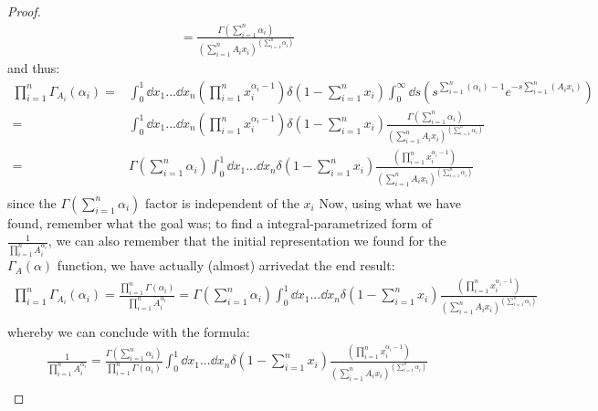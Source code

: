 \documentclass[a4paper,twoside]{article}
\begin{document}
\begin{proof}
\begin{align*}
= \frac{\Gamma \left( \sum_{i=1}^{n} \alpha_{i} \right)}{\left( \sum_{i=1}^{n}A_{i}x_{i} \right)^{\left( \sum_{i=1}^{n} \alpha_{i} \right)}} 
\end{align*}
and thus:
\begin{align*}
\prod_{i=1}^{n}\Gamma_{A_{i}}(\alpha_{i}) 
=&  \int_{0}^{1} \dd{x_{1}}...\dd{x_{n}} \left( \prod_{i=1}^{n} x_{i}^{\alpha_{i} - 1} \right) \delta \left(1 - \sum_{i=1}^{n}x_{i}\right) 
\int_{0}^{\infty} \dd{s} \left( s^{\sum_{i=1}^{n}(\alpha_{i}) - 1} e^{-s\sum_{i=1}^{n}(A_{i} x_{i})} \right) \\
=&  \int_{0}^{1} \dd{x_{1}}...\dd{x_{n}} \left( \prod_{i=1}^{n} x_{i}^{\alpha_{i} - 1} \right) \delta \left(1 - \sum_{i=1}^{n}x_{i}\right) 
\frac{\Gamma \left( \sum_{i=1}^{n} \alpha_{i} \right)}{\left( \sum_{i=1}^{n}A_{i}x_{i} \right)^{\left( \sum_{i=1}^{n} \alpha_{i} \right)}} \\
=& \Gamma \left( \sum_{i=1}^{n} \alpha_{i} \right)
 \int_{0}^{1} \dd{x_{1}}...\dd{x_{n}} 
\delta \left(1 - \sum_{i=1}^{n}x_{i}\right) 
\frac{\left( \prod_{i=1}^{n} x_{i}^{\alpha_{i} - 1} \right)}{\left( \sum_{i=1}^{n}A_{i}x_{i} \right)^{\left( \sum_{i=1}^{n} \alpha_{i} \right)}} \\
\end{align*}
since the $\Gamma \left( \sum_{i=1}^{n} \alpha_{i} \right)$ factor is independent of the $x_{i}$
Now, using what we have found, remember what the goal was; to find a integral-parametrized form of $\frac{1}{\prod_{i=1}^{n}A_{i}^{\alpha_{i}}}$, we can also remember that the initial representation we found for the $\Gamma_{A}(\alpha)$ function, we have actually (almost) arrivedat the end result:
\begin{align*}
\prod_{i=1}^{n}\Gamma_{A_{i}}(\alpha_{i}) 
= \frac{\prod_{i=1}^{n}\Gamma(\alpha_{i})}{\prod_{i=1}^{n}A_{i}^{\alpha_{i}}}
= \Gamma \left( \sum_{i=1}^{n} \alpha_{i} \right)
 \int_{0}^{1} \dd{x_{1}}...\dd{x_{n}} 
\delta \left(1 - \sum_{i=1}^{n}x_{i}\right) 
\frac{\left( \prod_{i=1}^{n} x_{i}^{\alpha_{i} - 1} \right)}{\left( \sum_{i=1}^{n}A_{i}x_{i} \right)^{\left( \sum_{i=1}^{n} \alpha_{i} \right)}} \\
\end{align*}
whereby we can conclude with the formula:
\begin{align*}
\frac{1}{\prod_{i=1}^{n}A_{i}^{\alpha_{i}}}
= \frac{\Gamma \left( \sum_{i=1}^{n} \alpha_{i} \right)}{\prod_{i=1}^{n}\Gamma(\alpha_{i})}
 \int_{0}^{1} \dd{x_{1}}...\dd{x_{n}} 
\delta \left(1 - \sum_{i=1}^{n}x_{i}\right) 
\frac{\left( \prod_{i=1}^{n} x_{i}^{\alpha_{i} - 1} \right)}{\left( \sum_{i=1}^{n}A_{i}x_{i} \right)^{\left( \sum_{i=1}^{n} \alpha_{i} \right)}} \\
\end{align*}
\end{proof}


 

\printbibliography      %
\end{document}
